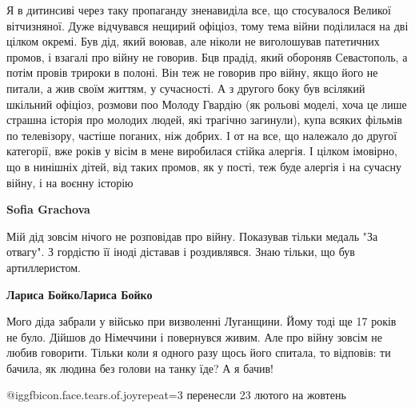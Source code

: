 \begin{itemize}
Я в дитинсиві через таку пропаганду зненавиділа все, що стосувалося Великої
вітчизняної. Дуже відчувався нещирий офіціоз, тому тема війни поділилася на дві
цілком окремі. Був дід, який воював, але ніколи не виголошував патетичних
промов, і взагалі про війну не говорив. Бцв прадід, який обороняв Севастополь,
а потім провів трироки в полоні. Він теж не говорив про війну, якщо його не
питали, а жив своїм життям, у сучасності. А з другого боку був всілякий
шкільний офіціоз, розмови поо Молоду Гвардію (як рольові моделі, хоча це лише
страшна історія про молодих людей, які трагічно загинули), купа всяких фільмів
по телевізору, частіше поганих, ніж добрих. І от на все, що належало до другої
категорії, вже років у вісім в мене виробилася стійка алергія. І цілком
імовірно, що в нинішніх дітей, від таких промов, як у пості, теж буде алергія і
на сучасну війну, і на воєнну історію

\begin{itemize} %
\textbf{Sofia Grachova} 

Мій дід зовсім нічого не розповідав про війну. Показував тільки медаль "За
отвагу". З гордістю її іноді діставав і роздивлявся. Знаю тільки, що був
артиллеристом.

\textbf{Лариса Бойко}\textbf{Лариса Бойко} 

Мого діда забрали у військо при визволенні Луганщини. Йому тоді ще 17 років не
було. Дійшов до Німеччини і повернувся живим. Але про війну зовсім не любив
говорити. Тільки коли я одного разу щось його спитала, то відповів: ти бачила,
як людина без голови на танку їде? А я бачив!

\end{itemize} %


@igg{fbicon.face.tears.of.joy}{repeat=3} перенесли 23 лютого на жовтень


\end{itemize} %
